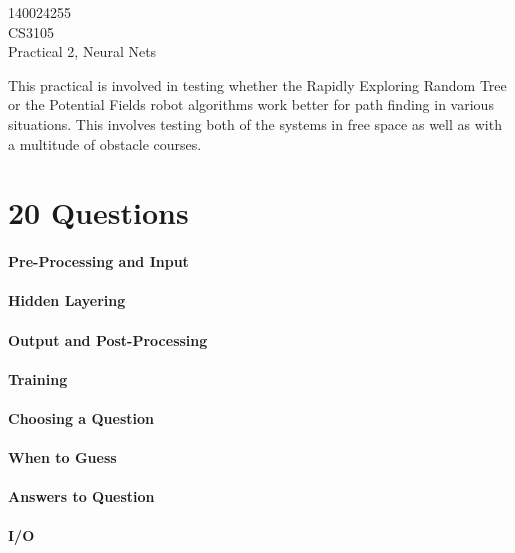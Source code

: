 \documentclass[12pt]{article}
\begin{document}
\begin{flushright}
140024255\\
CS3105\\
Practical 2, Neural Nets
\end{flushright}

This practical is involved in testing whether the Rapidly Exploring Random Tree or the Potential Fields robot algorithms work better for path finding in various situations. This involves testing both of the systems in free space as well as with a multitude of obstacle courses.

\section{20 Questions}
\paragraph*{Pre-Processing and Input}

\paragraph*{Hidden Layering}

\paragraph*{Output and Post-Processing}

\paragraph*{Training}

\paragraph*{Choosing a Question}

\paragraph*{When to Guess}

\paragraph*{Answers to Question}

\paragraph*{I/O}
\end{document}
